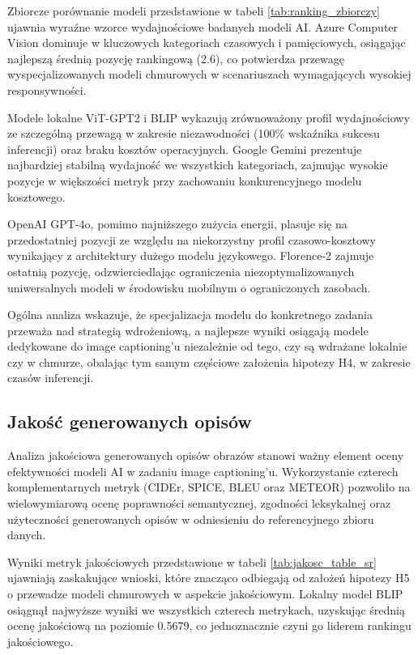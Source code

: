 Zbiorcze porównanie modeli przedstawione w tabeli \ref{tab:ranking_zbiorczy} ujawnia wyraźne wzorce wydajnościowe badanych modeli AI.
Azure Computer Vision dominuje w kluczowych kategoriach czasowych i pamięciowych, osiągając najlepszą średnią pozycję rankingową (2.6), 
co potwierdza przewagę wyspecjalizowanych modeli chmurowych w scenariuszach wymagających wysokiej responsywności.

Modele lokalne ViT-GPT2 i BLIP wykazują zrównoważony profil wydajnościowy ze szczególną przewagą w zakresie niezawodności 
(100\% wskaźnika sukcesu inferencji) oraz braku kosztów operacyjnych. Google Gemini prezentuje najbardziej stabilną wydajność we wszystkich kategoriach, 
zajmując wysokie pozycje w większości metryk przy zachowaniu konkurencyjnego modelu kosztowego.

OpenAI GPT-4o, pomimo najniższego zużycia energii,
plasuje się na przedostatniej pozycji ze względu na niekorzystny profil czasowo-kosztowy wynikający z architektury dużego modelu językowego.
Florence-2 zajmuje ostatnią pozycję, odzwierciedlając ograniczenia niezoptymalizowanych uniwersalnych modeli w środowisku mobilnym o ograniczonych zasobach.

Ogólna analiza wskazuje, że specjalizacja modelu do konkretnego zadania przeważa nad strategią wdrożeniową, a najlepsze wyniki 
osiągają modele dedykowane do image captioning'u niezależnie od tego, czy są wdrażane lokalnie czy w chmurze, obalając tym samym częściowe założenia hipotezy H4, w zakresie czasów inferencji.

\subsection{Jakość generowanych opisów}\label{ss:jakosc_generowanych_opisow}

\noindent
Analiza jakościowa generowanych opisów obrazów stanowi ważny element oceny efektywności modeli AI w zadaniu image captioning'u.
Wykorzystanie czterech komplementarnych metryk (CIDEr, SPICE, BLEU oraz METEOR) pozwoliło na wielowymiarową ocenę poprawności semantycznej,
zgodności leksykalnej oraz użyteczności generowanych opisów w odniesieniu do referencyjnego zbioru danych.

Wyniki metryk jakościowych przedstawione w tabeli \ref{tab:jakosc_table_sr} ujawniają zaskakujące wnioski, które znacząco odbiegają od założeń hipotezy H5
o przewadze modeli chmurowych w aspekcie jakościowym. Lokalny model BLIP osiągnął najwyższe wyniki we wszystkich czterech metrykach,
uzyskując średnią ocenę jakościową na poziomie 0.5679, co jednoznacznie czyni go liderem rankingu jakościowego.

